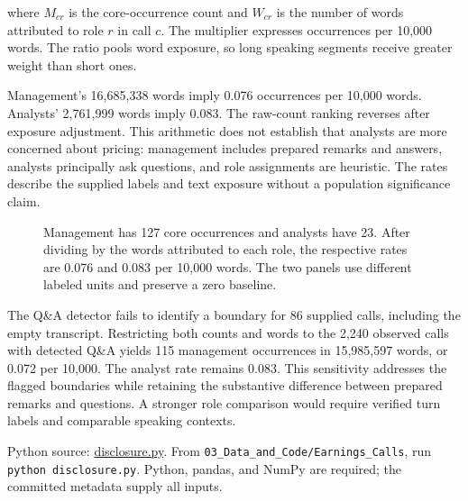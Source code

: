 where \(M_{cr}\) is the core-occurrence count and \(W_{cr}\) is the
number of words attributed to role \(r\) in call \(c\). The multiplier
expresses occurrences per 10,000 words. The ratio pools word exposure,
so long speaking segments receive greater weight than short ones.

Management's 16,685,338 words imply 0.076 occurrences per 10,000 words.
Analysts' 2,761,999 words imply 0.083. The raw-count ranking reverses
after exposure adjustment. This arithmetic does not establish that
analysts are more concerned about pricing: management includes prepared
remarks and answers, analysts principally ask questions, and role
assignments are heuristic. The rates describe the supplied labels and
text exposure without a population significance claim.

\begin{figure}[htbp]
\centering

\caption{Management has 127 core occurrences and analysts have 23. After dividing by the words attributed to each role, the respective rates are 0.076 and 0.083 per 10,000 words. The two panels use different labeled units and preserve a zero baseline.}\label{fig:M05_calls_exposure}
\end{figure}

The Q\&A detector fails to identify a boundary for 86 supplied calls,
including the empty transcript. Restricting both counts and words to the
2,240 observed calls with detected Q\&A yields 115 management
occurrences in 15,985,597 words, or 0.072 per 10,000. The analyst rate
remains 0.083. This sensitivity addresses the flagged boundaries while
retaining the substantive difference between prepared remarks and
questions. A stronger role comparison would require verified turn labels
and comparable speaking contexts.

\FloatBarrier
{}
Python source:
\href{../03_Data_and_Code/Earnings_Calls/disclosure.py}{disclosure.py}.
From \texttt{03\_Data\_and\_Code/Earnings\_Calls}, run
\texttt{python\ disclosure.py}. Python, pandas, and NumPy are required;
the committed metadata supply all inputs.

